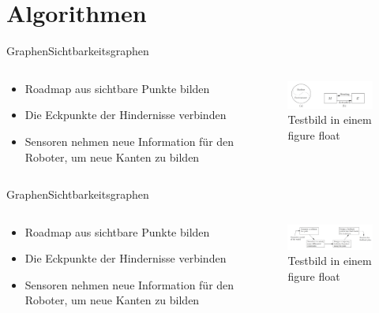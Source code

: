 \documentclass[t,aspectratio=169,dvipsnames]{beamer}
\begin{document}
\section{Algorithmen}

\begin{frame}{Graphen}{Sichtbarkeitsgraphen}
	\begin{columns}
		\begin{column}[T]{0.5\textwidth}
			\begin{itemize}
				\item Roadmap aus sichtbare Punkte bilden
				\item Die Eckpunkte der Hindernisse verbinden
				\item Sensoren nehmen neue Information für den Roboter, um neue  Kanten zu bilden
			\end{itemize}
		\end{column}
		\begin{column}[T]{0.5\textwidth}
			\begin{figure}
				\includegraphics[width=6.5cm]{images/img224.png}
				\caption{Testbild in einem figure float} 
			\end{figure}
		\end{column}
	\end{columns}
\end{frame}
\begin{frame}{Graphen}{Sichtbarkeitsgraphen}
	\begin{columns}
		\begin{column}[T]{0.5\textwidth}
			\begin{itemize}
				\item Roadmap aus sichtbare Punkte bilden
				\item Die Eckpunkte der Hindernisse verbinden
				\item Sensoren nehmen neue Information für den Roboter, um neue  Kanten zu bilden
			\end{itemize}
		\end{column}
		\begin{column}[T]{0.5\textwidth}
			\begin{figure}
				\includegraphics[width=6.5cm]{images/img247.png}
				\caption{Testbild in einem figure float} 
			\end{figure}
		\end{column}
	\end{columns}
\end{frame}
\end{document}
